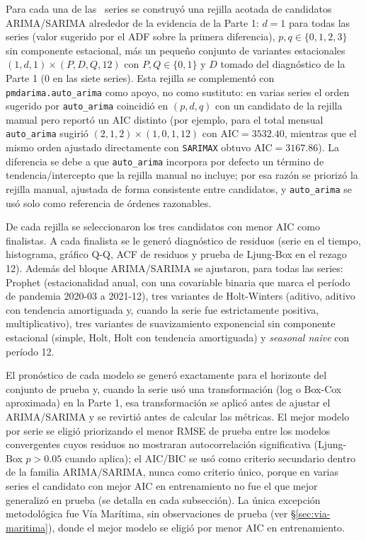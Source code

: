 \documentclass[12pt]{article}
\begin{document}
Para cada una de las \NumeroSeries\ series se construyó una rejilla acotada de candidatos ARIMA/SARIMA alrededor de la evidencia de la Parte 1: $d=1$ para todas las series (valor sugerido por el ADF sobre la primera diferencia), $p,q \in \{0,1,2,3\}$ sin componente estacional, más un pequeño conjunto de variantes estacionales $(1,d,1)\times(P,D,Q,12)$ con $P,Q \in \{0,1\}$ y $D$ tomado del diagnóstico de la Parte 1 (0 en las siete series). Esta rejilla se complementó con \texttt{pmdarima.auto\_arima} como apoyo, no como sustituto: en varias series el orden sugerido por \texttt{auto\_arima} coincidió en $(p,d,q)$ con un candidato de la rejilla manual pero reportó un AIC distinto (por ejemplo, para el total mensual \texttt{auto\_arima} sugirió $(2,1,2)\times(1,0,1,12)$ con AIC$=3532.40$, mientras que el mismo orden ajustado directamente con \texttt{SARIMAX} obtuvo AIC$=3167.86$). La diferencia se debe a que \texttt{auto\_arima} incorpora por defecto un término de tendencia/intercepto que la rejilla manual no incluye; por esa razón se priorizó la rejilla manual, ajustada de forma consistente entre candidatos, y \texttt{auto\_arima} se usó solo como referencia de órdenes razonables.

De cada rejilla se seleccionaron los tres candidatos con menor AIC como finalistas. A cada finalista se le generó diagnóstico de residuos (serie en el tiempo, histograma, gráfico Q-Q, ACF de residuos y prueba de Ljung-Box en el rezago 12). Además del bloque ARIMA/SARIMA se ajustaron, para todas las series: Prophet (estacionalidad anual, con una covariable binaria que marca el período de pandemia 2020-03 a 2021-12), tres variantes de Holt-Winters (aditivo, aditivo con tendencia amortiguada y, cuando la serie fue estrictamente positiva, multiplicativo), tres variantes de suavizamiento exponencial sin componente estacional (simple, Holt, Holt con tendencia amortiguada) y \emph{seasonal naive} con período 12.

El pronóstico de cada modelo se generó exactamente para el horizonte del conjunto de prueba y, cuando la serie usó una transformación (log o Box-Cox aproximada) en la Parte 1, esa transformación se aplicó antes de ajustar el ARIMA/SARIMA y se revirtió antes de calcular las métricas. El mejor modelo por serie se eligió priorizando el menor RMSE de prueba entre los modelos convergentes cuyos residuos no mostraran autocorrelación significativa (Ljung-Box $p>0.05$ cuando aplica); el AIC/BIC se usó como criterio secundario dentro de la familia ARIMA/SARIMA, nunca como criterio único, porque en varias series el candidato con mejor AIC en entrenamiento no fue el que mejor generalizó en prueba (se detalla en cada subsección). La única excepción metodológica fue Vía Marítima, sin observaciones de prueba (ver \S\ref{sec:via-maritima}), donde el mejor modelo se eligió por menor AIC en entrenamiento.
\end{document}
